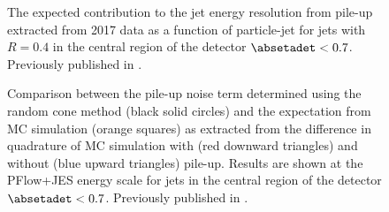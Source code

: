 

\begin{figure}[t]
    \caption{The expected contribution to the jet energy resolution from pile-up extracted from 2017 data as a function of particle-jet \pT for \antikt jets with $R = 0.4$ in the central region of the detector $\absetadet < 0.7$. Previously published in .}
    \label{fig:pile-up-jer-vs-pt}
\end{figure}



\begin{figure}[t]
    \caption{Comparison between the pile-up noise term \Npileup determined using the random cone method (black solid circles) and the expectation from MC simulation (orange squares) as extracted from the difference in quadrature of MC simulation with (red downward triangles) and without (blue upward triangles) pile-up. Results are shown at the PFlow+JES energy scale for jets in the central region of the detector $\absetadet < 0.7$. Previously published in .}
    \label{fig:non-closure}
\end{figure}



